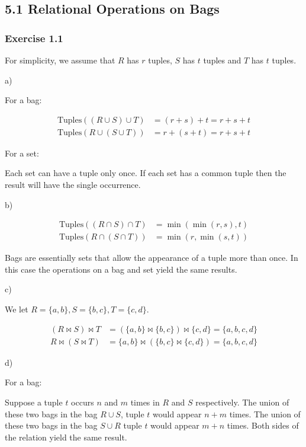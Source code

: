 \documentclass[../../main.tex]{subfiles}
\begin{document}
\subsection{5.1 Relational Operations on Bags}

\subsubsection*{Exercise 1.1}

For simplicity, we assume that $R$ has $r$ tuples, $S$ has
$t$ tuples and $T$ has $t$ tuples.

a)

For a bag:

\begin{align*}
  \mbox{Tuples}((R \cup S) \cup T) &= (r + s) + t = r + s + t \\
  \mbox{Tuples}(R \cup (S \cup T)) &= r + (s + t) = r + s + t
\end{align*}

For a set:

Each set can have a tuple only once. If each set has a
common tuple then the result will have the single occurrence.

b)

\begin{align*}
  \mbox{Tuples}((R \cap S) \cap T) &= \min(\min(r, s), t) \\
  \mbox{Tuples}(R \cap (S \cap T)) &= \min(r, \min(s, t))
\end{align*}


Bags are essentially sets that allow the appearance of a
tuple more than once. In this case the operations on
a bag and set yield the same results.

c)

We let $R = \{a, b\}, S = \{b, c\}, T = \{c, d\}$.

\begin{align*}
  (R \bowtie S) \bowtie T &=
    (\{a, b\} \bowtie \{b, c\}) \bowtie \{c, d\} = \{a, b, c, d\} \\
  R \bowtie (S \bowtie T) &=
    \{a, b\} \bowtie (\{b, c\} \bowtie \{c, d\}) = \{a, b, c, d\}
\end{align*}

d)

For a bag:

Suppose a tuple $t$ occurs $n$ and $m$ times in $R$ and $S$
respectively. The union of these two bags in the bag $R \cup S$,
tuple $t$ would appear $n+m$ times. The union of these two bags
in the bag $S \cup R$ tuple $t$ would appear $m+n$ times.
Both sides of the relation yield the same result.
\end{document}
